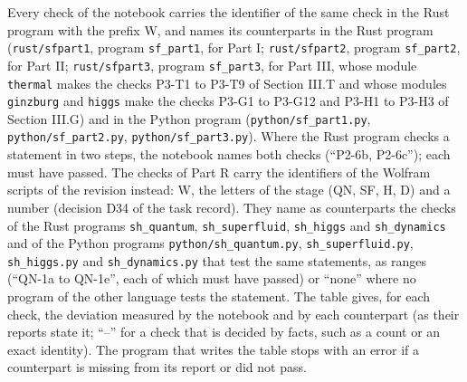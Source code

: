 \documentclass[
  10pt,
]{article}
\begin{document}
Every check of the notebook carries the identifier of the same check in
the Rust program with the prefix W, and names its counterparts in the
Rust program (\texttt{rust/sfpart1}, program \texttt{sf\_part1}, for
Part I; \texttt{rust/sfpart2}, program \texttt{sf\_part2}, for Part II;
\texttt{rust/sfpart3}, program \texttt{sf\_part3}, for Part III, whose
module \texttt{thermal} makes the checks P3-T1 to P3-T9 of Section III.T
and whose modules \texttt{ginzburg} and \texttt{higgs} make the checks
P3-G1 to P3-G12 and P3-H1 to P3-H3 of Section III.G) and in the Python
program (\texttt{python/sf\_part1.py}, \texttt{python/sf\_part2.py},
\texttt{python/sf\_part3.py}). Where the Rust program checks a statement
in two steps, the notebook names both checks (``P2-6b, P2-6c''); each
must have passed. The checks of Part R carry the identifiers of the
Wolfram scripts of the revision instead: W, the letters of the stage
(QN, SF, H, D) and a number (decision D34 of the task record). They name
as counterparts the checks of the Rust programs \texttt{sh\_quantum},
\texttt{sh\_superfluid}, \texttt{sh\_higgs} and \texttt{sh\_dynamics}
and of the Python programs \texttt{python/sh\_quantum.py},
\texttt{sh\_superfluid.py}, \texttt{sh\_higgs.py} and
\texttt{sh\_dynamics.py} that test the same statements, as ranges
(``QN-1a to QN-1e'', each of which must have passed) or ``none'' where
no program of the other language tests the statement. The table gives,
for each check, the deviation measured by the notebook and by each
counterpart (as their reports state it; ``--'' for a check that is
decided by facts, such as a count or an exact identity). The program
that writes the table stops with an error if a counterpart is missing
from its report or did not pass.
\end{document}

